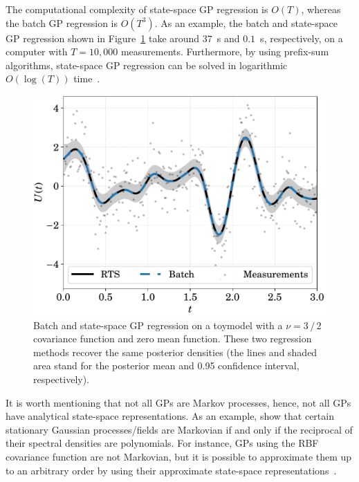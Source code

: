 The computational complexity of state-space GP regression is $O(T)$, whereas the batch GP regression is $O(T^3)$. As an example, the batch and state-space GP regression shown in Figure~\ref{fig:gp-kfs-eq} take around $37$~s and $0.1$~s, respectively, on a computer with $T=10,000$ measurements.  Furthermore, by using prefix-sum algorithms, state-space GP regression can be solved in logarithmic $O(\log(T))$ time~\citep{Corenflos2021SSGP, Simo2021Parallel}. 

\begin{figure}[t!]
	\centering
	\includegraphics[width=.75\linewidth]{figs/gp-kfs-eq}
	\caption{Batch and state-space GP regression on a toymodel with a \matern $\nu=3\, / \, 2$ covariance function and zero mean function. These two regression methods recover the same posterior densities (the lines and shaded area stand for the posterior mean and 0.95 confidence interval, respectively). }
	\label{fig:gp-kfs-eq}
\end{figure}

It is worth mentioning that not all GPs are Markov processes, hence, not all GPs have analytical state-space representations. As an example, \citet{Rozanov1977, Rozanov1982} show that certain stationary Gaussian processes/fields are Markovian if and only if the reciprocal of their spectral densities are polynomials. For instance, GPs using the RBF covariance function are not Markovian, but it is possible to approximate them up to an arbitrary order by using their approximate state-space representations~\citep{Simo2013SSGP}.


